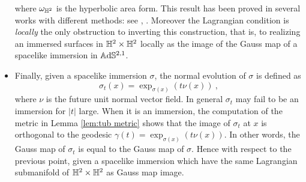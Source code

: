 \begin{itemize}[leftmargin=0.5cm]
where $\omega_{\mathbb{H}^2}$ is the hyperbolic area form. 
This result has been proved in several works with different methods: see \cite{bonsante2017equivariant}, \cite{Seppi_2017}. Moreover the Lagrangian condition is \emph{locally} the only obstruction to inverting this construction, that is, to realizing an immersed surfaces in $\mathbb{H}^2\times\mathbb{H}^2$ locally as the image of the Gauss map of a spacelike immersion in $\mathbb{A}\mathrm{d}\mathbb{S}^{2,1}$.
\item Finally, given a spacelike immersion $\sigma$,  the normal evolution of $\sigma$ is defined as 
\[
    \sigma_t(x)=\exp_{\sigma(x)}(t\nu(x))~,
\]
where $\nu$ is the future unit normal vector field. In general $\sigma_t$ may fail to be an immersion for $|t|$ large. When it is an immersion, the computation of the metric in Lemma \ref{lem:tub metric} shows that the image of $\sigma_t$ at $x$ is orthogonal to the geodesic $\gamma(t)=\exp_{\sigma(x)}(t\nu(x))$. In other words, the Gauss map of $\sigma_t$ is equal to the Gauss map of $\sigma$. Hence with respect to the previous point, given a spacelike immersion which have the same  Lagrangian submanifold of $\mathbb{H}^2\times\mathbb{H}^2$ as Gauss map image.
\end{itemize}